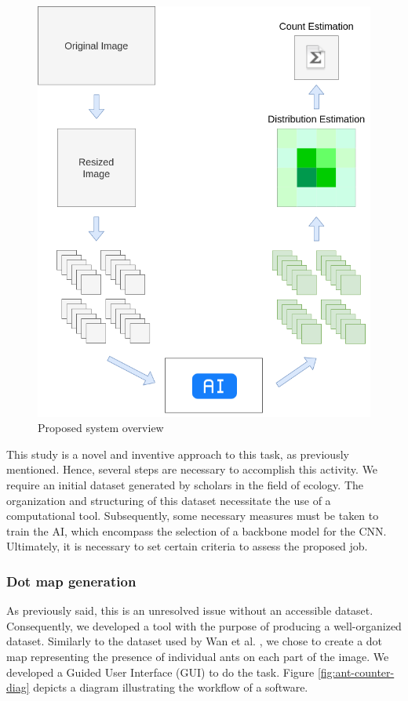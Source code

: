 \begin{figure}[h!]
    \centering
    \includegraphics[width = .5\linewidth]{Figures/overview.png}
    \caption{Proposed system overview}
    \label{fig:solution-overview}
\end{figure}

This study is a novel and inventive approach to this task, as previously mentioned. Hence, several steps are necessary to accomplish this activity. We require an initial dataset generated by scholars in the field of ecology. The organization and structuring of this dataset necessitate the use of a computational tool. Subsequently, some necessary measures must be taken to train the AI, which encompass the selection of a backbone model for the CNN. Ultimately, it is necessary to set certain criteria to assess the proposed job.

\subsubsection{Dot map generation}

As previously said, this is an unresolved issue without an accessible dataset. Consequently, we developed a tool with the purpose of producing a well-organized dataset. Similarly to the dataset used by Wan et al. \cite{wan2020kernel}, we chose to create a dot map representing the presence of individual ants on each part of the image. We developed a Guided User Interface (GUI) to do the task. Figure \ref{fig:ant-counter-diag} depicts a diagram illustrating the workflow of a software.

